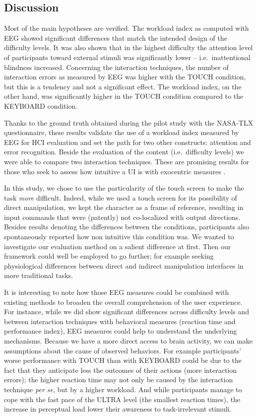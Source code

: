 \documentclass[]{sigchi}
\begin{document}
\subsection{Discussion}\label{discussion-1}

Most of the main hypotheses are verified. The workload index as computed
with EEG showed significant differences that match the intended design
of the difficulty levels. It was also shown that in the highest
difficulty the attention level of participants toward external stimuli
was significantly lower -- i.e.~inattentional blindness increased.
Concerning the interaction techniques, the number of interaction errors
as measured by EEG was higher with the TOUCH condition, but this is a
tendency and not a significant effect. The workload index, on the other
hand, was significantly higher in the TOUCH condition compared to the
KEYBOARD condition.

Thanks to the ground truth obtained during the pilot study with the
NASA-TLX questionnaire, these results validate the use of a workload
index measured by EEG for HCI evaluation and set the path for two other
constructs: attention and error recognition. Beside the evaluation of
the content (i.e.~difficulty levels) we were able to compare two
interaction techniques. These are promising results for those who seek
to assess how intuitive a UI is with exocentric measures
\citep{Frey2014a}.

In this study, we chose to use the particularity of the touch screen to
make the task \emph{more} difficult. Indeed, while we used a touch
screen for its possibility of direct manipulation, we kept the character
as a frame of reference, resulting in input commands that were
(patently) not co-localized with output directions. Besides results
denoting the differences between the conditions, participants also
spontaneously reported how non intuitive this condition was. We wanted
to investigate our evaluation method on a salient difference at first.
Then our framework could well be employed to go further; for example
seeking physiological differences between direct and indirect
manipulation interfaces in more traditional tasks.

It is interesting to note how those EEG measures could be combined with
existing methods to broaden the overall comprehension of the user
experience. For instance, while we did show significant differences
across difficulty levels and between interaction techniques with
behavioral measures (reaction time and performance index), EEG measures
could help to understand the underlying mechanisms. Because we have a
more direct access to brain activity, we can make assumptions about the
cause of observed behaviors. For example participants' worse performance
with TOUCH than with KEYBOARD could be due to the fact that they
anticipate less the outcomes of their actions (more interaction errors);
the higher reaction time may not only be caused by the interaction
technique \emph{per se}, but by a higher workload. And while
participants manage to cope with the fast pace of the ULTRA level (the
smallest reaction times), the increase in perceptual load lower their
awareness to task-irrelevant stimuli.
\end{document}
